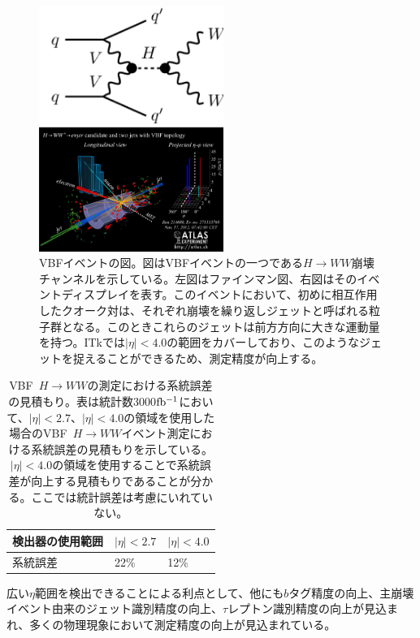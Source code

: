 \begin{figure}[bpt]
  \begin{minipage}{0.5\hsize}
    \begin{center}
    \includegraphics[width=60mm]{./VBF_fainman.png}
    \end{center}
  \end{minipage}
  \begin{minipage}{0.5\hsize}
    \begin{center}
    \includegraphics[width=60mm]{./VBF_event_display.png}
    \end{center}
  \end{minipage}
  \caption[VBFイベントの図]{VBFイベントの図。図はVBFイベントの一つである$H\rightarrow WW$崩壊チャンネルを示している。左図はファインマン図、右図はそのイベントディスプレイを表す。このイベントにおいて、初めに相互作用したクオーク対は、それぞれ崩壊を繰り返しジェットと呼ばれる粒子群となる。このときこれらのジェットは前方方向に大きな運動量を持つ。ITkでは$|\eta|<4.0$の範囲をカバーしており、このようなジェットを捉えることができるため、測定精度が向上する。}
  \label{VBF_image}
\end{figure}

\begin{table}[tbp]
\begin{center}
\caption[VBF~$H\rightarrow WW$の測定における系統誤差の見積もり]{VBF~$H\rightarrow WW$の測定における系統誤差の見積もり。表は統計数3000$\rm{fb^{-1}}$において、$|\eta| <2.7$、$|\eta| <4.0$の領域を使用した場合のVBF~$H\rightarrow WW$イベント測定における系統誤差の見積もりを示している。$|\eta| <4.0$の領域を使用することで系統誤差が向上する見積もりであることが分かる。ここでは統計誤差は考慮にいれていない。}
\label{VBF_uncertainty}
  \begin{tabular}{|lll|} \hline
    検出器の使用範囲 & $|\eta| <2.7 $ & $|\eta| < 4.0 $ \\ \hline
    系統誤差 & 22$\%$ & 12$\%$ \\ \hline
  \end{tabular}
\end{center}
\end{table}

広い$\eta$範囲を検出できることによる利点として、他にも$b$タグ精度の向上、主崩壊イベント由来のジェット識別精度の向上、$\tau$レプトン識別精度の向上が見込まれ、多くの物理現象において測定精度の向上が見込まれている。
